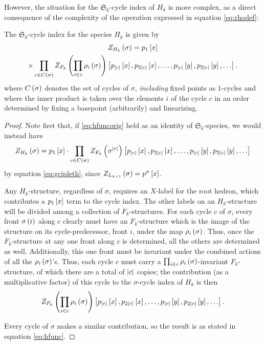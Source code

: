 \documentclass[sectionflow,singlespace,twoside,boldmathhdr]{brandiss} %
\numberwithin{section}{chapter}
\numberwithin{figure}{chapter}
\begin{document}
However, the situation for the $\mathfrak{S}_{k}$-cycle index of $H_{k}$ is more complex, as a direct consequence of the complexity of the operation expressed in equation \eqref{eq:rhodef}:
\begin{theorem}
  \label{thm:hfunc}
  The $\mathfrak{S}_{k}$-cycle index for the species $H_{k}$ is given by
  \begin{multline}
    \label{eq:hfunc}
    Z_{H_{k}} \left( {\sigma} \right) = p_{1} \left[ {x} \right] \\
    \times \prod_{c \in C \left( {\sigma} \right)} Z_{F_{k}} \left( {\prod_{i \in c} \rho_{i} \left( {\sigma} \right)} \right) \left[ {p_{\left\vert {c} \right\vert} \left[ {x} \right], p_{2 \left\vert {c} \right\vert} \left[ {x} \right], \dots, p_{\left\vert {c} \right\vert} \left[ {y} \right], p_{2 \left\vert {c} \right\vert} \left[ {y} \right], \dots} \right].
  \end{multline}
  where $C \left( {\sigma} \right)$ denotes the set of cycles of $\sigma$, \emph{including} fixed points as $1$-cycles and where the inner product is taken over the elements $i$ of the cycle $c$ in an order determined by fixing a basepoint (arbitrarily) and linearizing.
\end{theorem}

\begin{proof}
  Note first that, if \eqref{eq:hfuncorig} held as an identity of $\mathfrak{S}_{k}$-species, we would instead have
  \begin{equation*}
    Z_{H_{k}} \left( {\sigma} \right) = p_{1} \left[ {x} \right] \cdot \prod_{c \in C \left( {\sigma} \right)} Z_{F_{k}} \left( {\sigma^{\left\vert {c} \right\vert}} \right) \left[ {p_{\left\vert {c} \right\vert} \left[ {x} \right], p_{2 \left\vert {c} \right\vert} \left[ {x} \right], \dots, p_{\left\vert {c} \right\vert} \left[ {y} \right], p_{2 \left\vert {c} \right\vert} \left[ {y} \right], \dots} \right]
  \end{equation*}
  by equation \eqref{eq:gcipleth}, since $Z_{L_{k+1}} \left( {\sigma} \right) = p^{\sigma} \left[ {x} \right]$.

  Any $H_{k}$-structure, regardless of $\sigma$, requires an $X$-label for the root hedron, which contributes a $p_{1} \left[ {x} \right]$ term to the cycle index.
  The other labels on an $H_{k}$-structure will be divided among a collection of $F_{k}$-structures.
  For each cycle $c$ of $\sigma$, every front $\sigma \left( {i} \right)$ along $c$ clearly must have an $F_{k}$-structure which is the image of the structure on its cycle-predecessor, front $i$, under the map $\rho_{i} \left( {\sigma} \right)$.
  Thus, once the $F_{k}$-structure at any one front along $c$ is determined, all the others are determined as well.
  Additionally, this one front must be invariant under the combined actions of all the $\rho_{i} \left( {\sigma} \right)$'s.
  Thus, each cycle $c$ must carry a $\prod_{i \in c} \rho_{i} \left( {\sigma} \right)$-invariant $F_{k}$-structure, of which there are a total of $\left\vert {c} \right\vert$ copies; the contribution (as a multiplicative factor) of this cycle to the $\sigma$-cycle index of $H_{k}$ is then
  \begin{equation*}
    Z_{F_{k}} \left( {\prod_{i \in c} \rho_{i} \left( {\sigma} \right)} \right) \left[ {p_{\left\vert {c} \right\vert} \left[ {x} \right], p_{2 \left\vert {c} \right\vert} \left[ {x} \right], \dots, p_{\left\vert {c} \right\vert} \left[ {y} \right], p_{2 \left\vert {c} \right\vert} \left[ {y} \right], \dots} \right].
  \end{equation*}

  Every cycle of $\sigma$ makes a similar contribution, so the result is as stated in equation \eqref{eq:hfunc}.
\end{proof}
\end{document}
